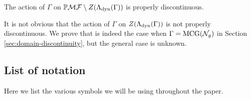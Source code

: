 \documentclass[12pt, reqno]{amsart}
\begin{document}
\begin{theorem}
  The action of $\Gamma$ on $\mathbb{P}\mathcal{MF} \setminus Z(\Lambda_{\mathrm{dyn}}(\Gamma))$ is properly discontinuous.
\end{theorem}

It is not obvious that the action of $\Gamma$ on $Z(\Lambda_{\mathrm{dyn}}(\Gamma))$ is not properly discontinuous.
We prove that is indeed the case when $\Gamma = \mathrm{MCG}(\mathcal{N}_g)$ in Section \ref{sec:domain-discontinuity}, but the general case is unknown.


\subsection*{List of notation}
Here we list the various symbols we will be using throughout the paper.
\end{document}

